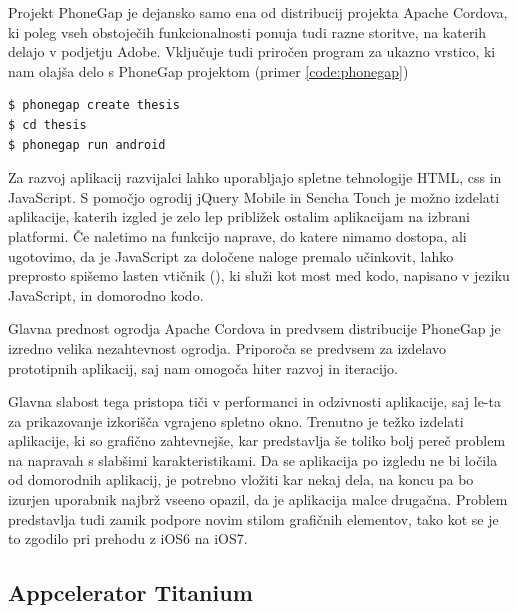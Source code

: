 Projekt PhoneGap\cite{phonegap} je dejansko samo ena od distribucij projekta Apache Cordova, ki poleg vseh obstoječih funkcionalnosti ponuja tudi razne storitve, na katerih delajo v podjetju Adobe. Vključuje tudi priročen program za ukazno vrstico, ki nam olajša delo s PhoneGap projektom (primer \ref{code:phonegap})

\begin{lstlisting}[caption=Primer uporabe programa phonegap za ukazno vrstico. Zadnja vrstica zažene pravkar ustvarjeno prazno aplikacijo na Android napravi ali emulatorju., label=code:phonegap]
$ phonegap create thesis
$ cd thesis
$ phonegap run android
\end{lstlisting}

Za razvoj aplikacij razvijalci lahko uporabljajo spletne tehnologije HTML, \gls{css} in JavaScript. S pomočjo ogrodij jQuery Mobile\cite{jquerymobile} in Sencha Touch\cite{sencha} je možno izdelati aplikacije, katerih izgled je zelo lep približek ostalim aplikacijam na izbrani platformi. Če naletimo na funkcijo naprave, do katere nimamo dostopa, ali ugotovimo, da je JavaScript za določene naloge premalo učinkovit, lahko preprosto spišemo lasten vtičnik (), ki služi kot most med kodo, napisano v jeziku JavaScript, in domorodno kodo.

Glavna prednost ogrodja Apache Cordova in predvsem distribucije PhoneGap je izredno velika nezahtevnost ogrodja. Priporoča se predvsem za izdelavo prototipnih aplikacij, saj nam omogoča hiter razvoj in iteracijo.

Glavna slabost tega pristopa tiči v performanci in odzivnosti aplikacije, saj le-ta za prikazovanje izkorišča vgrajeno spletno okno. Trenutno je težko izdelati aplikacije, ki so grafično zahtevnejše, kar predstavlja še toliko bolj pereč problem na napravah s slabšimi karakteristikami. Da se aplikacija po izgledu ne bi ločila od domorodnih aplikacij, je potrebno vložiti kar nekaj dela, na koncu pa bo izurjen uporabnik najbrž vseeno opazil, da je aplikacija malce drugačna. Problem predstavlja tudi zamik podpore novim stilom grafičnih elementov, tako kot se je to zgodilo pri prehodu z iOS6 na iOS7.

\subsection{Appcelerator Titanium}

